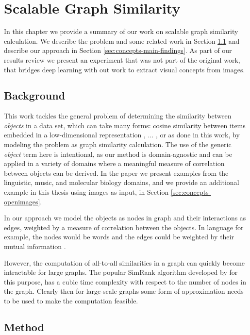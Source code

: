 \chapter{Scalable Graph Similarity}

In this chapter we provide a summary of our work on scalable graph similarity calculation.
We describe the problem and some related work in Section \ref{sec:concepts-background}
and describe our approach in Section \ref{sec:concepts-main-findings}. As part of our
results review we present an experiment that was not part of the original work, that
bridges deep learning with out work to extract visual concepts from images.


\section{Background}

\label{sec:concepts-background}

This work tackles the general problem of determining the similarity between \emph{objects}
in a data set, which can take many forms: cosine similarity between
items embedded in a low-dimensional representation \cite{word2vec}, ...
, or as done
in this work, by modeling the problem as graph similarity calculation.
The use of the generic \emph{object} term here is intentional, as our method is domain-agnostic
and can be applied in a variety of domains where a meaningful measure of correlation
between objects can be derived. In the paper we present examples from the linguistic,
music, and molecular biology domains, and we provide an additional example in this thesis
using images as input, in Section \ref{sec:concepts-openimages}.

In our approach we model the objects as nodes in graph and their interactions as edges,
weighted by a measure of correlation between the objects. In language for example, the
nodes would be words and the edges could be weighted by their mutual information \cite{mutual-information-nlp}.

However, the computation of all-to-all similarities in a graph can quickly become
intractable for large graphs. The popular SimRank algorithm developed by
\citet{simrank} for this purpose,
has a cubic time complexity with respect to the number of nodes in the graph.
Clearly then for large-scale graphs some form of approximation needs to be used
to make the computation feasible.


\section{Method}

